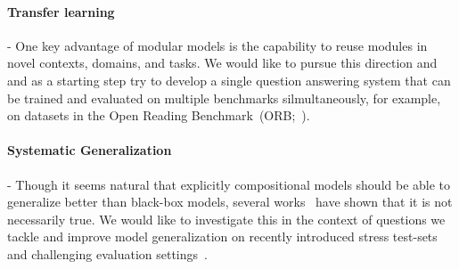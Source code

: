 \documentclass[main.tex]{subfiles}
\begin{document}
\paragraph{Transfer learning} - One key advantage of modular models is the capability to reuse modules in novel contexts, domains, and tasks. We would like to pursue this direction and and as a starting step try to develop a single question answering system that can be trained and evaluated on multiple benchmarks silmultaneously, for example, on datasets in the Open Reading Benchmark~(ORB;~).

\paragraph{Systematic Generalization} -
Though it seems natural that explicitly compositional models should be able to generalize better than black-box models, several works~\cite{sys-generalization-2018,closure-generalization-2020} have shown that it is not necessarily true. We would like to investigate this in the context of questions we tackle and improve model generalization on recently introduced stress test-sets~\cite{contrast-sets-2020} and challenging evaluation settings~\cite{text2sql-2018}.












\end{document}
